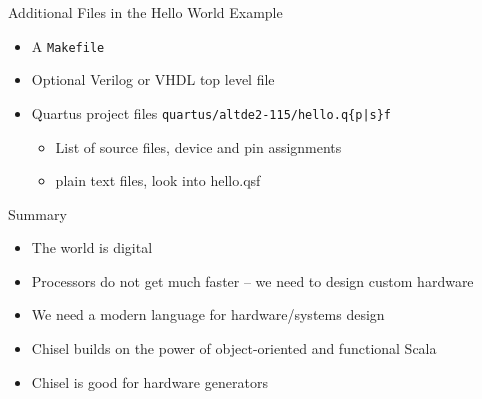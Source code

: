 \documentclass[xcolor=pdflatex,dvipsnames,table]{beamer}
\newcommand{\code}[1]{{\texttt{#1}}}
\begin{document}
\begin{frame}[fragile]{Additional Files in the Hello World Example}
\begin{itemize}
\item A \code{Makefile}
\item Optional Verilog or VHDL top level file %
\item Quartus project files \code{quartus/altde2-115/hello.q\{p|s\}f}
\begin{itemize}
\item List of source files, device and pin assignments
\item plain text files, look into hello.qsf
\end{itemize}
\end{itemize}
\end{frame}

\begin{frame}[fragile]{Summary}
\begin{itemize}
\item The world is digital
\item Processors do not get much faster -- we need to design custom hardware
\item We need a modern language for hardware/systems design
\item Chisel builds on the power of object-oriented and functional Scala
\item Chisel is good for hardware generators
\end{itemize}
\end{frame}
\end{document}
